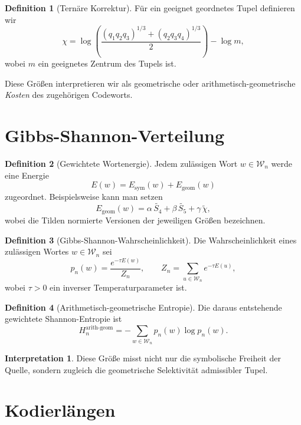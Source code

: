 \documentclass[11pt,a4paper]{article}
\theoremstyle{definition}
\newtheorem{definition}{Definition}[section]
\newtheorem{interpretation}{Interpretation}[section]
\begin{document}
	\begin{definition}[Ternäre Korrektur]
		Für ein geeignet geordnetes Tupel definieren wir
		\[
		\chi
		=
		\log\!\left(
		\frac{(q_1q_2q_3)^{1/3}+(q_2q_3q_4)^{1/3}}{2}
		\right)
		-\log m,
		\]
		wobei \(m\) ein geeignetes Zentrum des Tupels ist.
	\end{definition}
	
	Diese Größen interpretieren wir als geometrische oder arithmetisch-geometrische \emph{Kosten} des zugehörigen Codeworts.
	
	\section{Gibbs-Shannon-Verteilung}
	
	\begin{definition}[Gewichtete Wortenergie]
		Jedem zulässigen Wort \(w\in\mathcal W_n\) werde eine Energie
		\[
		E(w)=E_{\mathrm{sym}}(w)+E_{\mathrm{geom}}(w)
		\]
		zugeordnet. Beispielsweise kann man setzen
		\[
		E_{\mathrm{geom}}(w)
		=
		\alpha\,\widetilde{S_4}
		+
		\beta\,\widetilde{S_5}
		+
		\gamma\,\widetilde{\chi},
		\]
		wobei die Tilden normierte Versionen der jeweiligen Größen bezeichnen.
	\end{definition}
	
	\begin{definition}[Gibbs-Shannon-Wahrscheinlichkeit]
		Die Wahrscheinlichkeit eines zulässigen Wortes \(w\in\mathcal W_n\) sei
		\[
		p_n(w)=\frac{e^{-\tau E(w)}}{Z_n},
		\qquad
		Z_n=\sum_{u\in\mathcal W_n} e^{-\tau E(u)},
		\]
		wobei \(\tau>0\) ein inverser Temperaturparameter ist.
	\end{definition}
	
	\begin{definition}[Arithmetisch-geometrische Entropie]
		Die daraus entstehende gewichtete Shannon-Entropie ist
		\[
		H_n^{\mathrm{arith\text{-}geom}}
		=
		-\sum_{w\in\mathcal W_n} p_n(w)\log p_n(w).
		\]
	\end{definition}
	
	\begin{interpretation}
		Diese Größe misst nicht nur die symbolische Freiheit der Quelle, sondern zugleich die geometrische Selektivität admissibler Tupel.
	\end{interpretation}
	
	\section{Kodierlängen}
	
\end{document}
